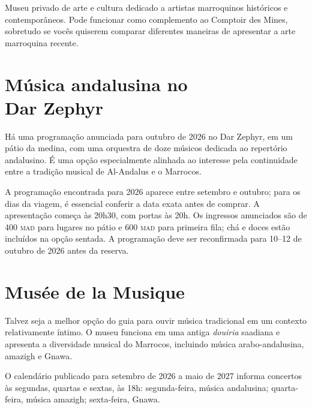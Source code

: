 Museu privado de arte e cultura dedicado a artistas marroquinos históricos e contemporâneos. Pode funcionar como complemento ao Comptoir des Mines, sobretudo se vocês quiserem comparar diferentes maneiras de apresentar a arte marroquina \mbox{recente.}

\chapter*{Música andalusina no\\ Dar Zephyr}

Há uma programação anunciada para outubro de 2026 no Dar Zephyr, em um pátio da medina, com uma orquestra de doze músicos dedicada ao repertório andalusino. É uma opção especialmente alinhada ao interesse pela continuidade entre a tradição musical de Al-Andalus e o Marrocos.

A programação encontrada para 2026 aparece entre setembro e outubro; para os dias da viagem, é essencial conferir a data exata antes de comprar. A apresentação começa às 20h30, com portas às 20h. Os ingressos anunciados são de 400 \textsc{mad} para lugares no pátio e 600 \textsc{mad} para primeira fila; chá e doces estão incluídos na opção sentada. A programação deve ser reconfirmada para 10--12 de outubro de 2026 antes da reserva.

\chapter{Musée de la Musique}

Talvez seja a melhor opção do guia para ouvir música tradicional em um contexto relativamente íntimo. O museu funciona em uma antiga \textit{douiria} saadiana e apresenta a diversidade musical do Marrocos, incluindo música arabo-andalusina, amazigh e Gnawa.

O calendário publicado para setembro de 2026 a maio de 2027 informa concertos às segundas, quartas e sextas, às 18h: segunda-feira, música andalusina; quarta-feira, música amazigh; sexta-feira, Gnawa.
